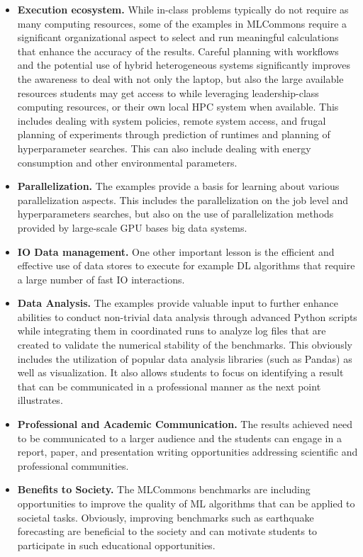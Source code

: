 \documentclass[utf8]{FrontiersinVancouver} %
\begin{document}
\begin{itemize}
  \item {\bf Execution ecosystem.} While in-class problems typically
    do not require as many computing resources, some of the examples in
    MLCommons require a significant organizational aspect to select
    and run meaningful calculations that enhance the accuracy of the
    results. Careful planning with workflows and the potential use
    of hybrid heterogeneous systems significantly improves the
    awareness to deal with not only the laptop, but also the large
    available resources students may get access to while leveraging
    leadership-class computing resources, or their own local HPC
    system when available. This includes dealing with system policies,
    remote system access, and frugal planning of experiments through
    prediction of runtimes and planning of hyperparameter searches. This
    can also include dealing with energy consumption and other
    environmental parameters.

  \item {\bf Parallelization.} The examples provide a basis for
    learning about various parallelization aspects. This includes the
    parallelization on the job level and hyperparameters searches, but
    also on the use of parallelization methods provided by large-scale
    GPU bases big data systems.

  \item {\bf IO Data management.} One other important lesson is the
    efficient and effective use of data stores to execute for example
    DL algorithms that require a large number of fast IO interactions.

  \item {\bf Data Analysis.} The examples provide valuable input to
    further enhance abilities to conduct non-trivial data analysis
    through advanced Python scripts while integrating them in
    coordinated runs to analyze log files that are created to
    validate the numerical stability of the benchmarks. This obviously
    includes the utilization of popular data analysis libraries (such
    as Pandas) as well as visualization. It also allows students to
    focus on identifying a result that can be communicated in a
    professional manner as the next point illustrates.


  \item {\bf Professional and Academic Communication.} The results
    achieved need to be communicated to a larger audience and the
    students can engage in a report, paper, and
    presentation writing opportunities addressing scientific and
    professional communities.

  \item {\bf Benefits to Society.} The MLCommons benchmarks are
    including opportunities to improve the quality of ML algorithms
    that can be applied to societal tasks. Obviously, improving
    benchmarks such as earthquake forecasting are beneficial to the
    society and can motivate students to participate in such
    educational opportunities.

\end{itemize}
\end{document}
